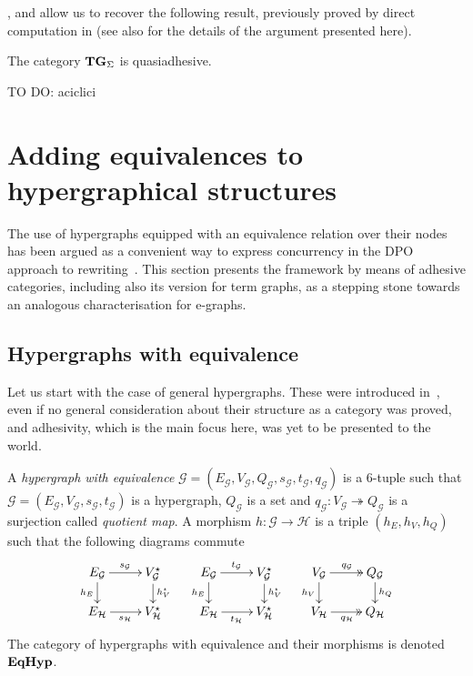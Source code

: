 \documentclass[3p]{elsarticle}
\newcommand{\catname}[1]{\textbf{\textup{#1}}}
\newcommand{\EqHyp}{\catname{EqHyp}} %
\newcommand{\tg}[0]{\catname{TG}_{\Sigma}}
\newcommand{\eto}{\twoheadrightarrow}
\theoremstyle{remark}
\theoremstyle{definition}
\begin{document}
,  and  allow us to recover the following result, previously proved by direct computation in \cite[Thm.~4.2]{CorradiniG05} (see also \cite[Cor.~5.15]{CastelnovoGM24} for the details of the argument presented here).
\begin{cor}\label{cor:term}
	The category $\tg$ is quasiadhesive.
\end{cor}

TO DO: aciclici

\section{Adding equivalences to hypergraphical structures}
\label{hypereq}
The use of hypergraphs equipped with an equivalence relation over their nodes has been argued as a convenient way to express concurrency in the DPO approach to rewriting~\cite{concur2006}.
This section presents the framework by means of adhesive categories, including also its version for term graphs, as a stepping stone towards an analogous characterisation for e-graphs.

\subsection{Hypergraphs with equivalence}

Let us start with the case of general hypergraphs. These were introduced in~\cite{concur2006}, even if no general consideration about their structure as a category was proved, and adhesivity, 
which is the main focus here, was yet to be presented to the world.

\begin{defi}
	A \emph{hypergraph with equivalence} $\mathcal{G} = (E_\mathcal{G}, V_{\mathcal{G}}, Q_\mathcal{G}, s_\mathcal{G}, t_\mathcal{G}, q_\mathcal{G})$ is a 6-tuple such that $\mathcal{G} = (E_\mathcal{G}, V_{\mathcal{G}}, s_\mathcal{G}, t_\mathcal{G})$ is a hypergraph, $Q_\mathcal{G}$ is a set and $q_{\mathcal{G}}: V_{\mathcal{G}}\eto Q_{\mathcal{G}}$ is a surjection called \emph{quotient map}. 
	A morphism $h\colon \mathcal{G\to H}$ is a triple $(h_E, h_V, h_Q)$ such that the following diagrams commute
	\[\xymatrix@R=15pt{
		{E_\mathcal{G}}\ar[r]^{s_\mathcal{G}}\ar[d]_{h_E} & {V_{\mathcal{G}}^\star}\ar[d]^{h_V^\star} & {E_\mathcal{G}}\ar[r]^{t_\mathcal{G}}\ar[d]_{h_E} & {V_{\mathcal{G}}^\star}\ar[d]^{h_V^\star} & {V_\mathcal{G}}\ar@{>>}[r]^{q_\mathcal{G}}\ar[d]_{h_V} & {Q_{\mathcal{G}}} \ar[d]^{h_Q} \\
		{E_\mathcal{H}}\ar[r]_{s_\mathcal{H}} & {V_{\mathcal{H}}^\star}	& {E_\mathcal{H}}\ar[r]_{t_\mathcal{H}} & {V_{\mathcal{H}}^\star}& {V_\mathcal{H}}\ar@{>>}[r]_{q_\mathcal{H}} & {Q_\mathcal{H}}
	}\]
	The category of hypergraphs with equivalence and their morphisms is denoted $\EqHyp$.
	
\end{defi}
\end{document}
